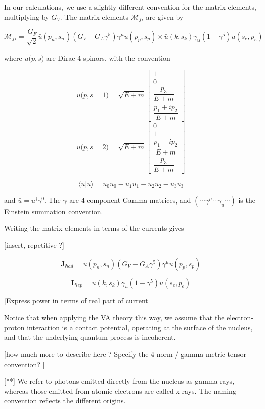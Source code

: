 \documentclass[11pt]{amsart}
\begin{document}
In our calculations, we use a slightly different convention for the matrix elements, multiplying by $G_{V}$.  The matrix elements $\mathcal{M}_{fi}$ are given by

$$\mathcal{M}_{fi}=\dfrac{G_{F}}{\sqrt{2}}\bar{u}(p_{n},s_{n})(G_{V}-G_{A}\gamma^{5})\gamma^{\mu}u(p_{p},s_{p})\times\bar{u}(k,s_{k})\gamma_{u}(1-\gamma^{5})u(s_{e},p_{e})$$

where $u{(p},s)$ are Dirac 4-spinors, with the convention

$$u{(p},s=1)=\sqrt{E+m}\left[\begin{array}{c}
1\\
0\\
\dfrac{p_{3}}{E+m}\\
\dfrac{p_{1}+ip_{2}}{E+m}
\end{array}\right]$$
$$u{(p},s=2)=\sqrt{E+m}\left[\begin{array}{c}
0\\
1\\
\dfrac{p_{1}-ip_{2}}{E+m}\\
\dfrac{p_{3}}{E+m}
\end{array}\right]$$

$$\langle\bar{u}|u\rangle=\bar{u}_{0}u_{0}-\bar{u}_{1}u_{1}-\bar{u}_{2}u_{2}-\bar{u}_{3}u_{3}$$

and $\bar{u}=u^{\dagger}\gamma^{0}$.  The $\gamma$ are 4-component Gamma matrices, and  $(\cdots\gamma^{\mu}\cdots\gamma_{u}\cdots)$ is the Einstein summation convention. 





Writing the matrix elements in terms of the currents gives

[insert, repetitive ?]

$$\mathbf{J}_{had}=\bar{u}(p_{n},s_{n})(G_{V}-G_{A}\gamma^{5})\gamma^{\mu}u(p_{p},s_{p})$$

$$\mathbf{L}_{lep}=\bar{u}(k,s_{k})\gamma_{u}(1-\gamma^{5})u(s_{e},p_{e})$$

[Express power in terms of real part of current]


Notice that when applying the VA theory this way, we assume that the electron-proton interaction is a contact potential, operating at the surface of the nucleus, and that the underlying quantum process is incoherent.  

[how much more to describe here ?  Specify the 4-norm / gamma metric tensor convention? ]

[**] We refer to photons emitted directly from the nucleus as gamma rays, whereas those emitted from atomic electrons are called x-rays.    The naming convention reflects the different origins.
\end{document}
